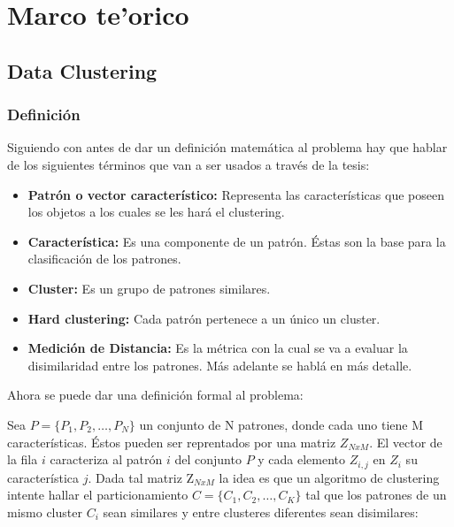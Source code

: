 \chapter{Marco te'orico} \label{chap:dclust}

\vspace{5 mm}

\section{Data Clustering} \label{sect:dclust}

\subsection{Definici\'on} \label{sect:dclustdef} \label{sect:dclustd}

Siguiendo con \cite{SwAjAm2009} antes de dar un definici\'on matem\'atica al problema hay que hablar de 
los siguientes t\'erminos que van a ser usados a trav\'es de la tesis:

\begin{itemize}

\item {\bf Patr\'on o vector caracter\'istico:} Representa las
caracter\'isticas que poseen los objetos a los cuales se les har\'a el clustering.

\item {\bf Caracter\'istica:} Es una componente de un patr\'on. \'Estas son
la base para la clasificaci\'on de los patrones.

\item {\bf Cluster:} Es un grupo de patrones similares.

\item {\bf Hard clustering:} Cada patr\'on pertenece a un \'unico un cluster.

\item {\bf Medici\'on de Distancia:} Es la m\'etrica con la cual se va a evaluar
la disimilaridad entre los patrones. M\'as adelante se habl\'a en m\'as detalle.

\end{itemize}

Ahora se puede dar una definici\'on formal al problema:

Sea $P = \{ P_1, P_2, \dots , P_N\}$ un conjunto de N patrones, 
donde cada uno tiene M caracter\'isticas. Éstos pueden
ser reprentados por una matriz $Z_{NxM}$. El vector de la fila $i$ caracteriza al 
patr\'on $i$ del conjunto $P$ y cada elemento $Z_{i,j}$ en $Z_i$ su caracter\'istica $j$.
Dada tal matriz Z$_{NxM}$ la idea es que un algoritmo de clustering intente hallar
el particionamiento $C = \{ C_1, C_2, \dots , C_K \}$ tal que los patrones
de un mismo cluster $C_i$ sean similares y entre clusteres diferentes
sean disimilares:

